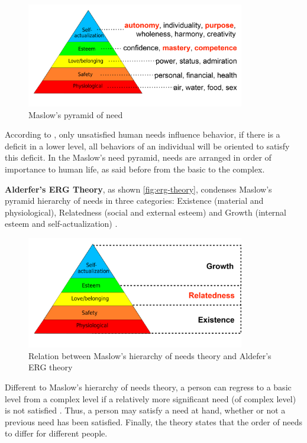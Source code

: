 \begin{figure}[htb]
 \caption{Maslow's pyramid of need}
 \label{fig:maslow-pyramid}
 \centering
 \includegraphics[width=0.85\textwidth]{images/chap-general-background/maslow-pyramid.png}
\end{figure}

According to , only unsatisfied human needs influence behavior, if there is a deficit in a lower level, all behaviors of an individual will be oriented to satisfy this deficit. In the Maslow's need pyramid, needs are arranged in order of importance to human life, as said before from the basic to the complex. 

\textbf{Alderfer's ERG Theory}, as shown \autoref{fig:erg-theory}, condenses Maslow’s pyramid hierarchy of needs in three categories: Existence (material and physiological), Relatedness (social and external esteem) and Growth (internal esteem and self-actualization) \cite{Alderfer1969,Alderfer1972}.

\begin{figure}[htb]
 \caption{Relation between Maslow's hierarchy of needs theory and Aldefer's ERG theory}
 \label{fig:erg-theory}
 \centering
 \includegraphics[width=0.85\textwidth]{images/chap-general-background/erg-theory.png}
 \fautor
\end{figure}


Different to Maslow's hierarchy of needs theory, a person can regress to a basic level from a complex level if a relatively more significant need (of complex level) is not satisfied \cite{Alderfer1972}. Thus, a person may satisfy a need at hand, whether or not a previous need has been satisfied. Finally, the theory states that the order of needs to differ for different people.

